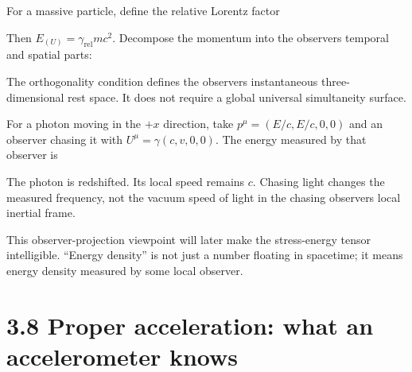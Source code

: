 \documentclass[
  11pt,
  letterpaper,
  oneside,
  openany]{scrbook}
\begin{document}
For a massive particle, define the relative Lorentz factor

\begin{center}
\begingroup
{}
\ifdim\wd\grmathbox>\linewidth
\resizebox{\linewidth}{!}{\usebox{\grmathbox}}
\else\usebox{\grmathbox}\fi
\endgroup
\end{center}

Then \(E_{(U)}=\gamma_{\mathrm{rel}}mc^2\). Decompose the momentum into
the observer\textquotesingle s temporal and spatial parts:

\begin{center}
\begingroup
{}
\ifdim\wd\grmathbox>\linewidth
\resizebox{\linewidth}{!}{\usebox{\grmathbox}}
\else\usebox{\grmathbox}\fi
\endgroup
\end{center}

The orthogonality condition defines the observer\textquotesingle s
instantaneous three-dimensional rest space. It does not require a global
universal simultaneity surface.

For a photon moving in the \(+x\) direction, take
\(p^\mu=(E/c,E/c,0,0)\) and an observer chasing it with
\(U^\mu=\gamma(c,v,0,0)\). The energy measured by that observer is

\begin{center}
\begingroup
{}
\ifdim\wd\grmathbox>\linewidth
\resizebox{\linewidth}{!}{\usebox{\grmathbox}}
\else\usebox{\grmathbox}\fi
\endgroup
\end{center}

The photon is redshifted. Its local speed remains \(c\). Chasing light
changes the measured frequency, not the vacuum speed of light in the
chasing observer\textquotesingle s local inertial frame.

This observer-projection viewpoint will later make the stress-energy
tensor intelligible. ``Energy density'' is not just a number floating in
spacetime; it means energy density measured by some local observer.

\hypertarget{proper-acceleration-what-an-accelerometer-knows}{%
\section{3.8 Proper acceleration: what an accelerometer
knows}\label{proper-acceleration-what-an-accelerometer-knows}}
\end{document}
